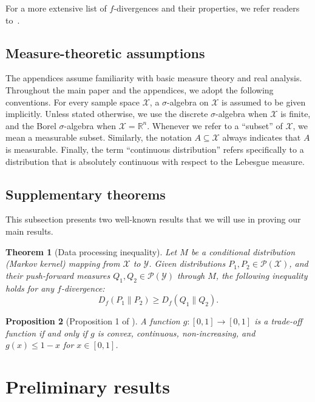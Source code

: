 \documentclass[accepted]{article}
\theoremstyle{plain} %
\newtheorem{theorem}{Theorem}[section]
\newtheorem{proposition}[theorem]{Proposition}
\theoremstyle{definition}
\theoremstyle{remark}
\begin{document}
For a more extensive list of 
$f$-divergences and their properties, we refer readers to~\citet{sason2016f}.  

\subsection{Measure-theoretic assumptions}

The appendices assume familiarity with basic measure theory and real analysis. 
Throughout the main paper and the appendices, we adopt the following conventions. For every sample space \( \mathcal{X} \), a \(\sigma\)-algebra on \( \mathcal{X} \) is assumed to be given implicitly. Unless stated otherwise, we use the discrete \(\sigma\)-algebra when \( \mathcal{X} \) is finite, and the Borel \(\sigma\)-algebra when \( \mathcal{X} = \mathbb{R}^n \). 
Whenever we refer to a “subset” of \( \mathcal{X} \), we mean a measurable subset. Similarly, the notation \( A \subseteq \mathcal{X} \) always indicates that \( A \) is measurable.
Finally, the term “continuous distribution” refers specifically to a distribution that is absolutely continuous with respect to the Lebesgue measure.


\subsection{Supplementary theorems}

This subsection presents two well-known results that we will use in proving our main results.


\begin{theorem}[Data processing inequality]\label{thm: dpi}
   Let \( M \) be a conditional distribution (Markov kernel) mapping from \( \mathcal{X} \) to \( \mathcal{Y} \). Given distributions \( P_1, P_2 \in \mathcal{P}(\mathcal{X}) \), and their push-forward measures \( Q_1, Q_2 \in \mathcal{P}(\mathcal{Y}) \) through \( M \), the following inequality holds for any \( f \)-divergence:
\[
D_f(P_1 \parallel P_2) \geq D_f(Q_1 \parallel Q_2).
\]
\end{theorem}

\begin{proposition}[Proposition 1 of \citet{dong2022gaussian}]\label{prop: trade-off}
    A function $g : [0,1] \to [0,1]$ is a trade-off function if and only if $g$ is convex, continuous, non-increasing, and $g(x) \leq 1 - x$ for $x \in [0,1]$.
\end{proposition}

\section{Preliminary results
}\label{sec: proofs prilim}
\end{document}
